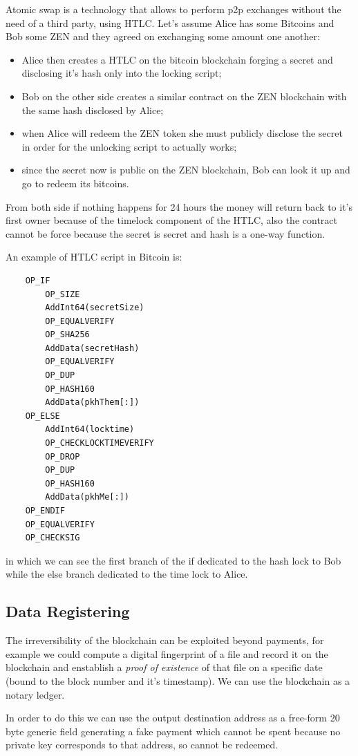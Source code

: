 Atomic swap is a technology that allows to perform p2p exchanges without the need of a third party, using HTLC.
Let's assume Alice has some Bitcoins and Bob some ZEN and they agreed on exchanging some amount one another:
\begin{itemize}
    \item Alice then creates a HTLC on the bitcoin blockchain forging a secret and disclosing it's hash only into the locking script;
    \item Bob on the other side creates a similar contract on the ZEN blockchain with the same hash disclosed by Alice;
    \item when Alice will redeem the ZEN token she must publicly disclose the secret in order for the unlocking script to actually works;
    \item since the secret now is public on the ZEN blockchain, Bob can look it up and go to redeem its bitcoins.
\end{itemize}
From both side if nothing happens for 24 hours the money will return back to it's first owner because of the timelock component of the HTLC, also the contract cannot be force because the secret is secret and hash is a one-way function.

An example of HTLC script in Bitcoin is:
\begin{verbatim}
    OP_IF
        OP_SIZE
        AddInt64(secretSize)
        OP_EQUALVERIFY
        OP_SHA256
        AddData(secretHash)
        OP_EQUALVERIFY
        OP_DUP
        OP_HASH160
        AddData(pkhThem[:])
    OP_ELSE
        AddInt64(locktime)
        OP_CHECKLOCKTIMEVERIFY
        OP_DROP
        OP_DUP
        OP_HASH160
        AddData(pkhMe[:])
    OP_ENDIF
    OP_EQUALVERIFY
    OP_CHECKSIG
\end{verbatim}
in which we can see the first branch of the if dedicated to the hash lock to Bob while the else branch dedicated to the time lock to Alice.

\subsection{Data Registering}
The irreversibility of the blockchain can be exploited beyond payments, for example we could compute a digital fingerprint of a file and record it on the blockchain and enstablish a \emph{proof of existence} of that file on a specific date (bound to the block number and it's timestamp).
We can use the blockchain as a notary ledger.

In order to do this we can use the output destination address as a free-form 20 byte generic field generating a fake payment which cannot be spent because no private key corresponds to that address, so cannot be redeemed.

